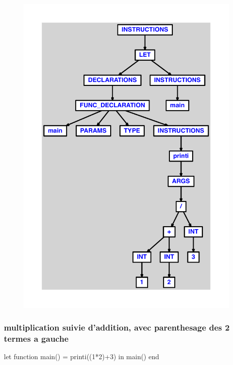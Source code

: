 \documentclass{article}
\begin{document}
\begin{figure}[H]\centering\includegraphics[max width=\textwidth]{ast/ast_98.pdf}\end{figure}\subsubsection{multiplication suivie d'addition, avec parenthesage des 2 termes a gauche}
\begin{verbatimtab}
let function main() = printi((1*2)+3) in main() end
\end{verbatimtab}
\end{document}
